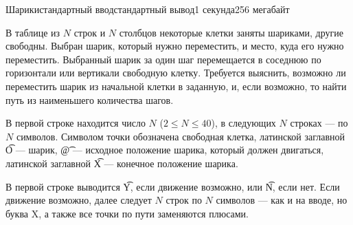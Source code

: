 \begin{problem}{Шарики}{стандартный ввод}{стандартный вывод}{1 секунда}{256 мегабайт}

В таблице из $N$ строк и $N$ столбцов некоторые клетки заняты шариками, другие свободны. Выбран шарик, который нужно переместить, и место, куда его нужно переместить. Выбранный шарик за один шаг перемещается в соседнюю по горизонтали или вертикали свободную клетку. Требуется выяснить, возможно ли переместить шарик из начальной клетки в заданную, и, если возможно, то найти путь из наименьшего количества шагов.

\InputFile
В первой строке находится число $N$ ($2 \le N \le 40$), в следующих $N$ строках --- по $N$ символов. Символом точки обозначена свободная клетка, латинской заглавной \t{O} --- шарик, \t{@} --- исходное положение шарика, который должен двигаться, латинской заглавной \t{X} --- конечное положение шарика.


\OutputFile
В первой строке выводится \t{Y}, если движение возможно, или \t{N}, если нет. Если движение возможно, далее следует $N$ строк по $N$ символов --- как и на вводе, но буква X, а также все точки по пути заменяются плюсами. 

\Examples

\begin{example}
%
%
%
\end{example}

\end{problem}

